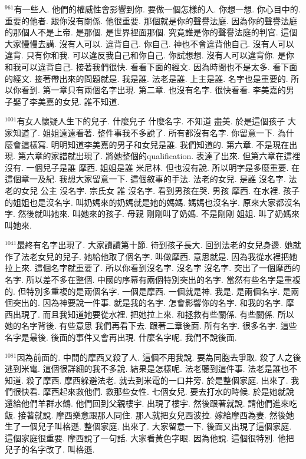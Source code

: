 \documentclass{book}
\begin{document}
$^{961}$有一些人.
他們的權威性會影響到你.
要做一個怎樣的人.
你想一想.
你心目中的.
重要的他者.
跟你沒有關係.
他很重要.
那個就是你的聲譽法庭.
因為你的聲譽法庭的那個人不是上帝.
是那個.
是世界裡面那個.
究竟誰是你的聲譽法庭的判官.
這個大家慢慢去講.
沒有人可以.
違背自己.
你自己.
神也不會違背他自己.
沒有人可以違背.
只有你和我.
可以違反我自己和你自己.
你試想想.
沒有人可以違背你.
是你和我可以違背自己.
接著我們很快.
看看下面的經文.
因為時間也不是太多.
看下面的經文.
接著帶出來的問題就是.
我是誰.
法老是誰.
上主是誰.
名字也是重要的.
所以你看到.
第一章只有兩個名字出現.
第二章.
也沒有名字.
很快看看.
李美嘉的男子娶了李美嘉的女兒.
誰不知道.

$^{1001}$有女人懷疑人生下的兒子.
什麼兒子 什麼名字.
不知道 盡美.
於是這個孩子 大家知道了.
姐姐遠遠看著.
整件事我不多說了.
所有都沒有名字.
你留意一下.
為什麼會這樣寫.
明明知道李美嘉的男子和女兒是誰.
我們知道的.
第六章.
不是現在出現.
第六章的家譜就出現了.
將她整個的qualification.
表達了出來.
但第六章在這裡沒有.
一個兒子是誰 摩西.
姐姐是誰 米尼林.
但也沒有說.
所以明字是多麼重要.
在這個章一及紀.
我想大家留意一下.
這個敘事的手法.
法老的女兒.
是誰 沒名字.
法老的女兒 公主 沒名字.
宗氏女 誰 沒名字.
看到男孩在哭.
男孩 摩西.
在水裡.
孩子的姐姐也是沒名字.
叫奶媽來的奶媽就是她的媽媽.
媽媽也沒名字.
原來大家都沒名字.
然後就叫她來.
叫她來的孩子.
母親 剛剛叫了奶媽.
不是剛剛 姐姐.
叫了奶媽來 叫她來.

$^{1041}$最終有名字出現了.
大家讀讀第十節.
待到孩子長大.
回到法老的女兒身邊.
她就作了法老女兒的兒子.
她給他取了個名字.
叫做摩西.
意思就是.
因為我從水裡把她拉上來.
這個名字就重要了.
所以你看到沒名字.
沒名字 沒名字.
突出了一個摩西的名字.
所以差不多在整個.
中國的序幕有兩個特別突出的名字.
當然有些名字是重複的.
但特別多重複的是兩個名字.
一個是摩西.
一個就是神.
我是.
是兩個名字.
是兩個突出的.
因為神要說一件事.
就是我的名字.
怎會影響你的名字.
和我的名字.
摩西出現了.
而且我知道她要從水裡.
把她拉上來.
和拯救有些關係.
有些關係.
所以她的名字背後.
有些意思 我們再看下去.
跟著二章後面.
所有名字.
很多名字.
這些名字是最後.
後面的事件又會再出現.
什麼名字呢.
我們不說後面.

$^{1081}$因為前面的.
中間的摩西又殺了人.
這個不用我說.
要為同胞去爭取.
殺了人之後逃到米電.
這個很詳細的我不多說.
結果是怎樣呢.
法老聽到這件事.
法老是誰也不知道.
殺了摩西.
摩西躲避法老.
就去到米電的一口井旁.
於是整個家庭.
出來了.
我們很快看.
摩西起來救他們.
救那些女性.
七個女兒.
要去打水的時候.
於是她就說還給他們羊群水鶴.
他們回到父親樓宇.
出現了樓宇.
然後跟著就說.
請他們進來吃飯.
接著就說.
摩西樂意跟那人同住.
那人就把女兒西波拉.
嫁給摩西為妻.
然後她生了一個兒子叫格遜.
整個家庭.
出來了.
大家留意一下.
後面又出現了這個家庭.
這個家庭很重要.
摩西說了一句話.
大家看黃色字眼.
因為他說.
這個很特別.
他把兒子的名字改了.
叫格遜.
\end{document}
